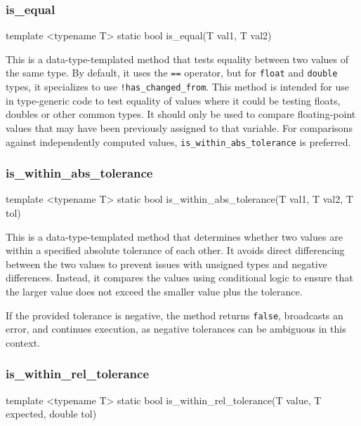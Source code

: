 \documentclass[11pt,fleqn]{report}
\begin{document}
\subsubsection{is\_equal}
\begin{code}
template <typename T>
static bool is_equal(T val1, T val2)
\end{code}

This is a data-type-templated method that tests equality between two values of 
the same type. By default, it uses the \texttt{==} operator, but for 
\texttt{float} and \texttt{double} types, it specializes to use 
\texttt{!has\_changed\_from}. This method is intended for use in type-generic code 
to test equality of values where it could be testing floats, doubles or other common types. 
It should only be used to compare floating-point values that may have been previously 
assigned to that variable. For comparisons against independently computed values,
\texttt{is\_within\_abs\_tolerance} is preferred.

\subsubsection{is\_within\_abs\_tolerance}
\begin{code}
template <typename T>
static bool is_within_abs_tolerance(T val1,
                                    T val2,
                                    T tol)
\end{code}

This is a data-type-templated method that determines whether two values are 
within a specified absolute tolerance of each other. It avoids direct 
differencing between the two values to prevent issues with unsigned types
and negative differences. Instead, it compares the values using conditional 
logic to ensure that the larger value does not exceed the smaller value plus
the tolerance.

If the provided tolerance is negative, the method returns \texttt{false}, 
broadcasts an error, and continues execution, as negative tolerances can be 
ambiguous in this context.

\subsubsection{is\_within\_rel\_tolerance}
\begin{code}
template <typename T>
static bool is_within_rel_tolerance(T value,
                                    T expected,
                                    double tol)
\end{code}
\end{document}
